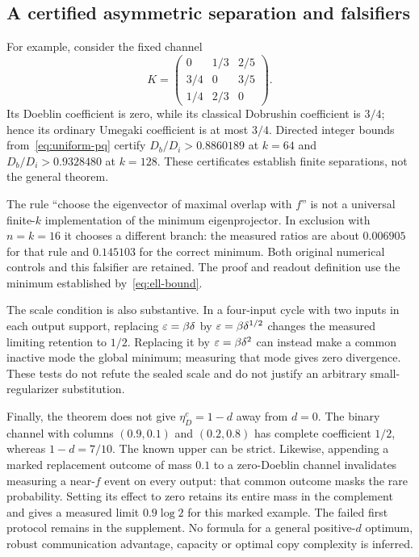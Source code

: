 \subsection{A certified asymmetric separation and falsifiers}
For example, consider the fixed channel
\[
 K=\begin{pmatrix}
 0&1/3&2/5\\3/4&0&3/5\\1/4&2/3&0
 \end{pmatrix}.
\]
Its Doeblin coefficient is zero, while its classical Dobrushin coefficient is $3/4$; hence its ordinary Umegaki coefficient is at most $3/4$. Directed integer bounds from~\eqref{eq:uniform-pq} certify $D_b/D_i>0.8860189$ at $k=64$ and $D_b/D_i>0.9328480$ at $k=128$. These certificates establish finite separations, not the general theorem.

The rule ``choose the eigenvector of maximal overlap with $f$'' is not a universal finite-$k$ implementation of the minimum eigenprojector. In exclusion with $n=k=16$ it chooses a different branch: the measured ratios are about $0.006905$ for that rule and $0.145103$ for the correct minimum. Both original numerical controls and this falsifier are retained. The proof and readout definition use the minimum established by~\eqref{eq:ell-bound}.

The scale condition is also substantive. In a four-input cycle with two inputs in each output support, replacing $\varepsilon=\beta\delta$ by $\varepsilon=\beta\delta^{1/2}$ changes the measured limiting retention to $1/2$. Replacing it by $\varepsilon=\beta\delta^2$ can instead make a common inactive mode the global minimum; measuring that mode gives zero divergence. These tests do not refute the sealed scale and do not justify an arbitrary small-regularizer substitution.

Finally, the theorem does not give $\eta_D^c=1-d$ away from $d=0$. The binary channel with columns $(0.9,0.1)$ and $(0.2,0.8)$ has complete coefficient $1/2$, whereas $1-d=7/10$. The known upper can be strict. Likewise, appending a marked replacement outcome of mass $0.1$ to a zero-Doeblin channel invalidates measuring a near-$f$ event on every output: that common outcome masks the rare probability. Setting its effect to zero retains its entire mass in the complement and gives a measured limit $0.9\log2$ for this marked example. The failed first protocol remains in the supplement. No formula for a general positive-$d$ optimum, robust communication advantage, capacity or optimal copy complexity is inferred.
